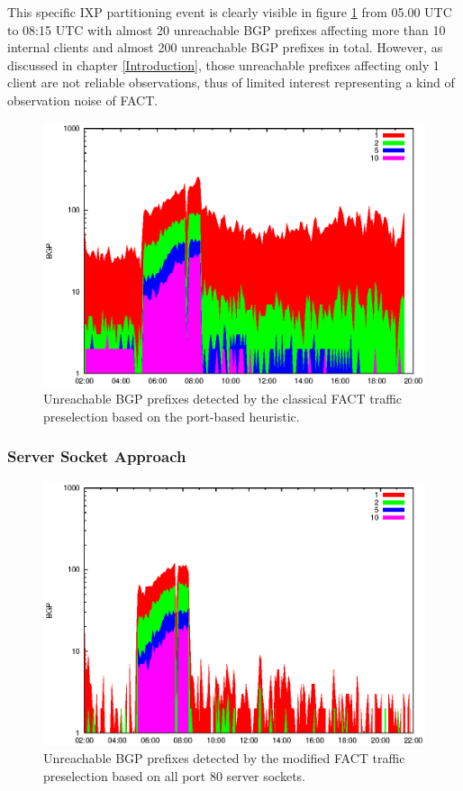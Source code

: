 This specific IXP partitioning event is clearly visible in figure  \ref{fig:AMS_IX_FACT_REF} from 05.00 UTC to 08:15 UTC with almost 20 unreachable BGP prefixes affecting more than 10 internal clients and almost 200 unreachable BGP prefixes in total. However, as discussed in chapter \ref{Introduction}, those unreachable prefixes affecting only 1 client are not reliable observations, thus of limited interest representing a kind of observation noise of FACT.

\begin{figure}
	[htbp] \centering 
	\includegraphics[width=0.75\linewidth]{images/events/2010_03_25/bgp_log_port80_ref.eps}
	\caption{Unreachable BGP prefixes detected by the classical FACT traffic preselection based on the port-based heuristic.} 
	\label{fig:AMS_IX_FACT_REF} 
\end{figure}

\subsubsection{Server Socket Approach}
\begin{figure}
	[htbp] \centering 
	\includegraphics[width=0.75\linewidth]{images/events/2010_03_25/bgp_log_allPort80SES.eps}
	\caption{Unreachable BGP prefixes detected by the modified FACT traffic preselection based on all port 80 server sockets.} 
	\label{fig:AMS_IX_FACT_allSES80} 
\end{figure}

